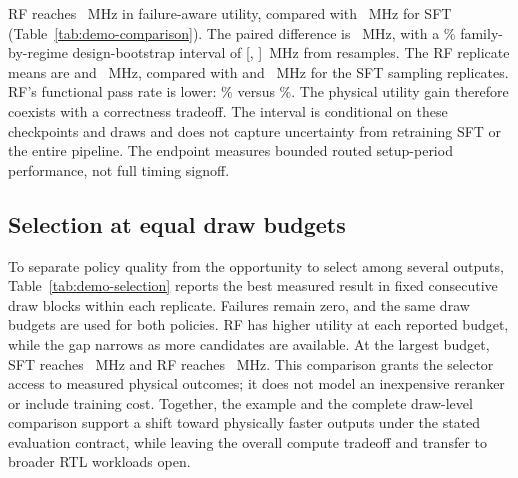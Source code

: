 RF reaches ~MHz in failure-aware utility, compared
with ~MHz for SFT
(Table~\ref{tab:demo-comparison}). The paired difference is
~MHz, with a \%
family-by-regime design-bootstrap interval of
[, ]~MHz from
 resamples. The RF replicate means are
 and ~MHz, compared
with  and ~MHz for
the SFT sampling replicates. RF's functional pass rate is lower:
\% versus \%.
The physical utility gain therefore coexists with a correctness tradeoff.
The interval is conditional on these checkpoints and draws and does not
capture uncertainty from retraining SFT or the entire pipeline. The endpoint
measures bounded routed setup-period performance, not full timing signoff.

\subsection{Selection at equal draw budgets}

To separate policy quality from the opportunity to select among several
outputs, Table~\ref{tab:demo-selection} reports the best measured result in
fixed consecutive draw blocks within each replicate. Failures remain zero,
and the same draw budgets are used for both policies. RF has higher utility
at each reported budget, while the gap narrows as more candidates are
available. At the largest budget, SFT reaches
~MHz and RF reaches
~MHz. This comparison grants the selector
access to measured physical outcomes; it does not model an inexpensive
reranker or include training cost. Together, the example and the complete
draw-level comparison support a shift toward physically faster outputs under
the stated evaluation contract, while leaving the overall compute tradeoff
and transfer to broader RTL workloads open.
